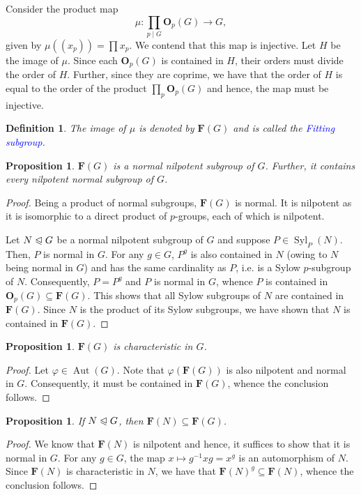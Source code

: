 \documentclass[12pt]{article}
\theoremstyle{thmstyle}
\newtheorem{proposition}[theorem]{Proposition}
\theoremstyle{defstyle}
\newtheorem{definition}[theorem]{Definition}
\newcommand{\Aut}{\operatorname{Aut}}
\newcommand{\define}[1]{\textcolor{blue}{\textit{#1}}}
\newcommand{\bfO}{\mathbf{O}}
\newcommand{\bfF}{\mathbf{F}} %
\newcommand{\Syl}{\operatorname{Syl}}
\newcommand{\noreq}{\trianglelefteqslant}
\begin{document}
Consider the product map 
\begin{equation*}
    \mu: \prod_{p\mid G}\bfO_p(G)\longrightarrow G,
\end{equation*}
given by $\mu\left((x_p)\right) = \prod x_p$. We contend that this map is injective. Let $H$ be the image of $\mu$. Since each $\bfO_p(G)$ is contained in $H$, their orders must divide the order of $H$. Further, since they are coprime, we have that the order of $H$ is equal to the order of the product $\prod_p\bfO_p(G)$ and hence, the map must be injective.

\begin{definition}
    The image of $\mu$ is denoted by $\bfF(G)$ and is called the \define{Fitting subgroup}.
\end{definition}

\begin{proposition}
    $\bfF(G)$ is a normal nilpotent subgroup of $G$. Further, it contains every nilpotent normal subgroup of $G$.
\end{proposition}
\begin{proof}
    Being a product of normal subgroups, $\bfF(G)$ is normal. It is nilpotent as it is isomorphic to a direct product of $p$-groups, each of which is nilpotent.

    Let $N\noreq G$ be a normal nilpotent subgroup of $G$ and suppose $P\in\Syl_P(N)$. Then, $P$ is normal in $G$. For any $g\in G$, $P^g$ is also contained in $N$ (owing to $N$ being normal in $G$) and has the same cardinality as $P$, i.e. is a Sylow $p$-subgroup of $N$. Consequently, $P = P^g$ and $P$ is normal in $G$, whence $P$ is contained in $\bfO_p(G)\subseteq\bfF(G)$. This shows that all Sylow subgroups of $N$ are contained in $\bfF(G)$. Since $N$ is the product of its Sylow subgroups, we have shown that $N$ is contained in $\bfF(G)$.
\end{proof}

\begin{proposition}
    $\bfF(G)$ is characteristic in $G$.
\end{proposition}
\begin{proof}
    Let $\varphi\in\Aut(G)$. Note that $\varphi(\bfF(G))$ is also nilpotent and normal in $G$. Consequently, it must be contained in $\bfF(G)$, whence the conclusion follows.
\end{proof}

\begin{proposition}
    If $N\noreq G$, then $\bfF(N)\subseteq\bfF(G)$.
\end{proposition}
\begin{proof}
    We know that $\bfF(N)$ is nilpotent and hence, it suffices to show that it is normal in $G$. For any $g\in G$, the map $x\mapsto g^{-1}xg = x^g$ is an automorphism of $N$. Since $\bfF(N)$ is characteristic in $N$, we have that $\bfF(N)^g\subseteq\bfF(N)$, whence the conclusion follows.
\end{proof}
\end{document}
